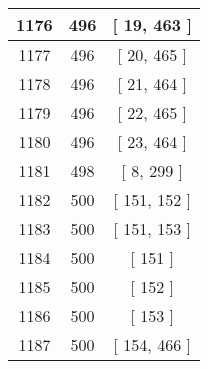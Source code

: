 \begin{center}
\begin{longtable}[H]{|| c c c ||}
1176 & 496 & [ 19, 463 ]
\\\hline
1177 & 496 & [ 20, 465 ]
\\\hline
1178 & 496 & [ 21, 464 ]
\\\hline
1179 & 496 & [ 22, 465 ]
\\\hline
1180 & 496 & [ 23, 464 ]
\\\hline
1181 & 498 & [ 8, 299 ]
\\\hline
1182 & 500 & [ 151, 152 ]
\\\hline
1183 & 500 & [ 151, 153 ]
\\\hline
1184 & 500 & [ 151 ]
\\\hline
1185 & 500 & [ 152 ]
\\\hline
1186 & 500 & [ 153 ]
\\\hline
1187 & 500 & [ 154, 466 ]
\\\hline
\end{longtable}
\end{center}
